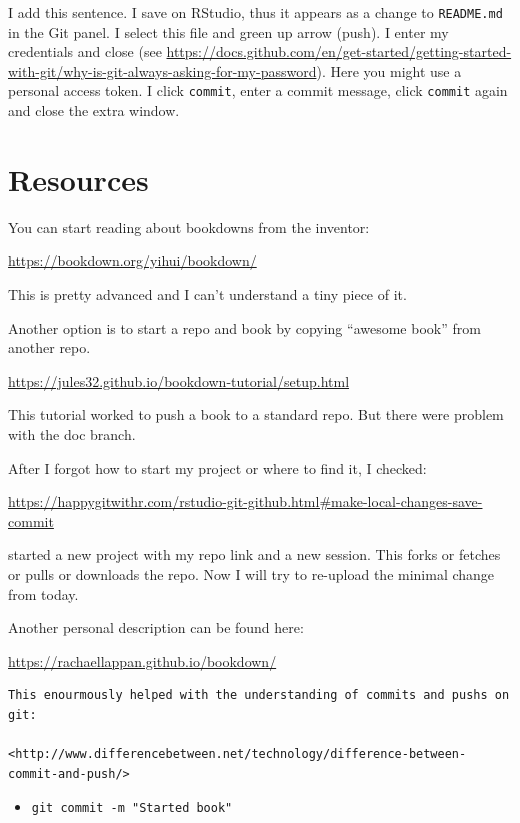 \documentclass[
]{book}
\providecommand{\tightlist}{%
  \setlength{\itemsep}{0pt}\setlength{\parskip}{0pt}}
\begin{document}
I add this sentence. I save on RStudio, thus it appears as a change to \texttt{README.md} in the Git panel. I select this file and green up arrow (push). I enter my credentials and close (see \url{https://docs.github.com/en/get-started/getting-started-with-git/why-is-git-always-asking-for-my-password}). Here you might use a personal access token. I click \texttt{commit}, enter a commit message, click \texttt{commit} again and close the extra window.

\hypertarget{resources}{%
\section{Resources}\label{resources}}

You can start reading about bookdowns from the inventor:

\url{https://bookdown.org/yihui/bookdown/}

This is pretty advanced and I can't understand a tiny piece of it.

Another option is to start a repo and book by copying ``awesome book'' from another repo.

\url{https://jules32.github.io/bookdown-tutorial/setup.html}

This tutorial worked to push a book to a standard repo. But there were problem with the doc branch.

After I forgot how to start my project or where to find it, I checked:

\url{https://happygitwithr.com/rstudio-git-github.html\#make-local-changes-save-commit}

started a new project with my repo link and a new session. This forks or fetches or pulls or downloads the repo. Now I will try to re-upload the minimal change from today.

Another personal description can be found here:

\url{https://rachaellappan.github.io/bookdown/}

\begin{verbatim}
This enourmously helped with the understanding of commits and pushs on git:

<http://www.differencebetween.net/technology/difference-between-commit-and-push/>
\end{verbatim}

\begin{itemize}
\tightlist
\item
  \texttt{git\ commit\ -m\ "Started\ book"}
\end{itemize}
\end{document}
